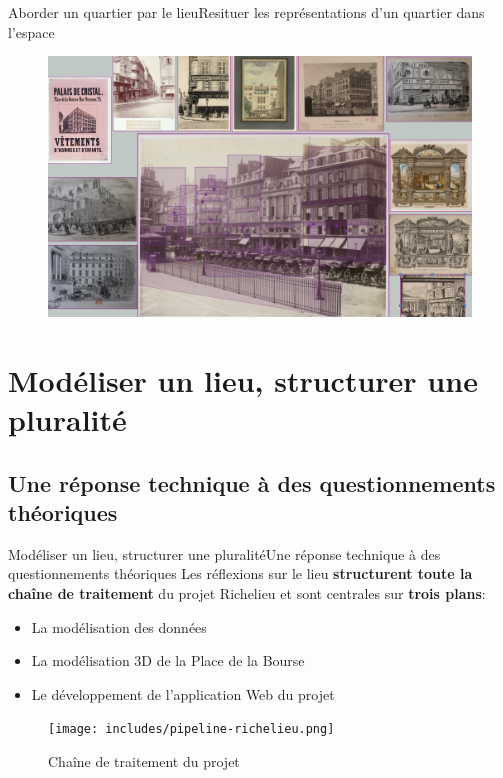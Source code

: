 \documentclass[9pt]{beamer}
\begin{document}
\begin{frame}{Aborder un quartier par le lieu}{Resituer les représentations d'un quartier dans l'espace}
	\begin{figure}
		\includegraphics[width=\textwidth]{includes/final_cha.png}
	\end{figure}
\end{frame}

\section{Modéliser un lieu, structurer une pluralité}
\subsection{Une réponse technique à des questionnements théoriques}
\begin{frame}{Modéliser un lieu, structurer une pluralité}{Une réponse technique à des questionnements théoriques}
	Les réflexions sur le lieu \textbf{structurent toute la chaîne de traitement} du projet Richelieu et sont centrales sur \textbf{trois plans}:
	\begin{itemize}
		\item La modélisation des données
		\item La modélisation 3D de la Place de la Bourse
		\item Le développement de l'application Web du projet
	\end{itemize}
	\begin{figure}
		\texttt{[image: includes/pipeline-richelieu.png]}
		\caption{Chaîne de traitement du projet}
	\end{figure}
\end{frame}
\end{document}
